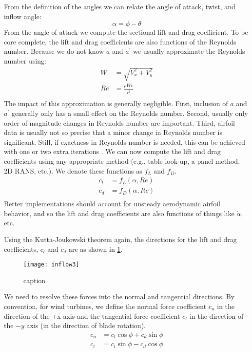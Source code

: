 From the definition of the angles we can relate the angle of attack, twist, and inflow angle:
\begin{equation}
    \alpha = \phi - \theta
    \label{eq:aoa}
\end{equation}
From the angle of attack we compute the sectional lift and drag coefficient.  To be core complete, the lift and drag coefficients are also functions of the Reynolds number.  Because we do not know $a$ and $a^\prime$ we usually approximate the Reynolds number using:
\begin{equation}
    \begin{aligned}
        W &= \sqrt{V_x^2 + V_y^2}\\
        Re &= \frac{\rho W c}{\mu}\\
    \end{aligned}
\end{equation}
The impact of this approximation is generally negligible.  First, inclusion of $a$ and $a^\prime$ generally only has a small effect on the Reynolds number.  Second, usually only order of magnitude changes in Reynolds number are important.  Third, airfoil data is usually not so precise that a minor change in Reynolds number is significant.  Still, if exactness in Reynolds number is needed, this can be achieved with one or two extra iterations \cite{Ning2014-Simple-Solution}.  We can now compute the lift and drag coefficients using any appropriate method (e.g., table look-up, a panel method, 2D RANS, etc.).  We denote these functions as $f_L$ and $f_D$.
\begin{equation}
    \begin{aligned}
        c_l &= f_L(\alpha, Re)\\
        c_d &= f_D(\alpha, Re)\\
    \end{aligned}
\end{equation}
Better implementations should account for unsteady aerodynamic airfoil behavior, and so the lift and drag coefficients are also functions of things like $\dot{\alpha}$, etc.

Using the Kutta-Joukowski theorem again, the directions for the lift and drag coefficients, $c_l$ and $c_d$ are as shown in \cref{fig:inflow3}.
\begin{figure}[htbp]
\centering
\texttt{[image: inflow3]}
\caption{caption}
\label{fig:inflow3}
\end{figure}
We need to resolve these forces into the normal and tangential directions.  By convention, for wind turbines, we define the normal force coefficient $c_n$ in the direction of the +x-axis and the tangential force coefficient $c_t$ in the direction of the $-y$ axis (in the direction of blade rotation).
\begin{equation}
    \begin{aligned}
        c_n &= c_l \cos\phi + c_d \sin\phi\\
        c_t &= c_l \sin\phi - c_d \cos\phi\\
    \end{aligned}
\end{equation}

